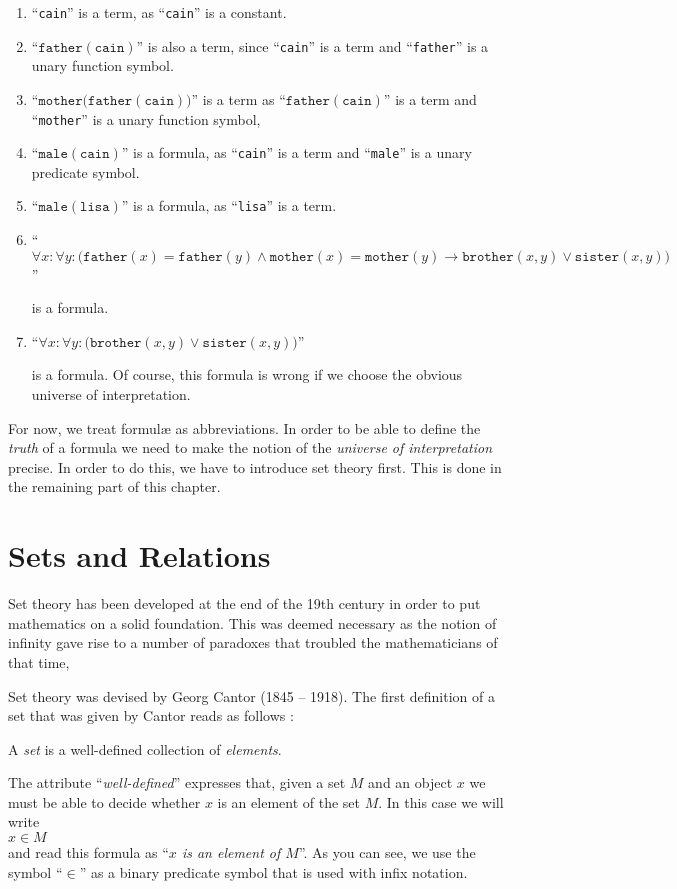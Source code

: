 \begin{enumerate}
\item ``\texttt{cain}'' is a term, as ``\texttt{cain}'' is a constant.
\item ``$\mathtt{father}(\mathtt{cain})$'' is also a term, since  ``\texttt{cain}''
      is a  term and ``\texttt{father}'' is a unary function symbol.
\item ``$\mathtt{mother}\bigl(\mathtt{father}(\mathtt{cain})\bigr)$'' is a term 
      as  ``$\mathtt{father}(\mathtt{cain})$'' is a term and  ``\texttt{mother}'' is
      a unary function symbol,
\item ``$\texttt{male}(\mathtt{cain})$'' is a formula, as
      ``\texttt{cain}'' is a term and
      ``\texttt{male}'' is a unary predicate symbol.
\item ``$\texttt{male}(\mathtt{lisa})$'' is a formula, as
      ``\texttt{lisa}'' is a term. 
\item ``$\forall x: \forall y: \bigl(\mathtt{father}(x) = \mathtt{father}(y) \wedge 
          \mathtt{mother}(x) = \mathtt{mother}(y)
         \rightarrow       \mathtt{brother}(x,y) \vee \mathtt{sister}(x,y)\bigr)$''
      
      is a formula.
\item ``$\forall x\colon \forall y\colon\bigl( \mathtt{brother}(x,y) \vee  \mathtt{sister}(x,y)\bigr)$'' 

      is a formula.  Of course, this formula is wrong if we choose the obvious universe of
      interpretation.
\end{enumerate}
For now, we treat {formul\ae} as abbreviations.  In order to be able to define the \emph{truth}
of a formula  we need to  make the notion of the \emph{universe of interpretation} 
precise.   In order to do this, we have to introduce set theory first.  This is done
 in the remaining part of this chapter.

\section{Sets and Relations}
Set theory has  been developed at the end of the 19th century in order to put mathematics
on a solid foundation.  This was deemed necessary as the notion of infinity gave rise to a
number of paradoxes that troubled the mathematicians of that time,

Set theory was devised by Georg Cantor (1845 -- 1918).  The first definition of a set that
was given by Cantor reads as follows \cite{cantor:1895}:
\begin{center}
A \emph{set} is a well-defined collection of \emph{elements}.  
\end{center}
The attribute  ``\emph{well-defined}'' expresses that, given a set $M$ and an object $x$
we must be able to decide whether $x$ is an element of the set $M$.
In this case we will write \\[0.2cm]
\hspace*{1.3cm} $x \in M$ \\[0.2cm]
and read this formula as  ``\emph{$x$ is an element of $M$}''.
As you can see, we use the symbol ``$\in$'' as a binary predicate symbol that is used with
infix notation.

